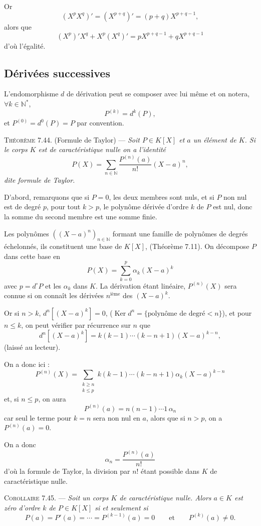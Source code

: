 Or
\[
(X^pX^q)'=(X^{p+q})'=(p+q)X^{p+q-1},
\]
alors que
\[
(X^p)'X^q+X^p(X^q)'=pX^{p+q-1}+qX^{p+q-1}
\]
d'où l'égalité. \bookend

\subsection*{Dérivées successives}

L'endomorphisme $d$ de dérivation peut se composer avec lui même et on notera, $\forall k\in\mathbb N^*$,
\[
P^{(k)}=d^k(P),
\]
et $P^{(0)}=d^0(P)=P$ par convention.

\medskip\noindent\textsc{Théorème 7.44.} (Formule de Taylor) --- \emph{Soit $P\in K[X]$ et $a$ un élément de $K$. Si le corps $K$ est de caractéristique nulle on a l'identité
\[
P(X)=\sum_{n\in\mathbb N}\frac{P^{(n)}(a)}{n!}(X-a)^n,
\]
dite formule de Taylor.}

D'abord, remarquons que si $P=0$, les deux membres sont nuls, et si $P$ non nul est de degré $p$, pour tout $k>p$, le polynôme dérivée d'ordre $k$ de $P$ est nul, donc la somme du second membre est une somme finie.

Les polynômes $((X-a)^n)_{n\in\mathbb N}$ formant une famille de polynômes de degrés échelonnés, ils constituent une base de $K[X]$, (Théorème 7.11). On décompose $P$ dans cette base en
\[
P(X)=\sum_{k=0}^p\alpha_k(X-a)^k
\]
avec $p=d^\circ P$ et les $\alpha_k$ dans $K$. La dérivation étant linéaire, $P^{(n)}(X)$ sera connue si on connaît les dérivées $n^\text{ième}$ des $(X-a)^k$.

Or si $n>k$, $d^n[(X-a)^k]=0$, ($\operatorname{Ker}d^n=\{\text{polynôme de degré}<n\}$), et pour $n\le k$, on peut vérifier par récurrence sur $n$ que
\[
d^n[(X-a)^k]=k(k-1)\cdots(k-n+1)(X-a)^{k-n},
\]
(laissé au lecteur).

On a donc ici :
\[
P^{(n)}(X)=\sum_{\substack{k\ge n\\k\le p}}k(k-1)\cdots(k-n+1)\alpha_k(X-a)^{k-n}
\]
et, si $n\le p$, on aura
\[
P^{(n)}(a)=n(n-1)\cdots1\,\alpha_n
\]
car seul le terme pour $k=n$ sera non nul en $a$, alors que si $n>p$, on a $P^{(n)}(a)=0$.

On a donc
\[
\alpha_n=\frac{P^{(n)}(a)}{n!}
\]
d'où la formule de Taylor, la division par $n!$ étant possible dans $K$ de caractéristique nulle. \bookend

\medskip\noindent\textsc{Corollaire 7.45.} --- \emph{Soit un corps $K$ de caractéristique nulle. Alors $a\in K$ est zéro d'ordre $k$ de $P\in K[X]$ si et seulement si
\[
P(a)=P'(a)=\cdots=P^{(k-1)}(a)=0\qquad\text{et}\qquad P^{(k)}(a)\ne0.
\]}

